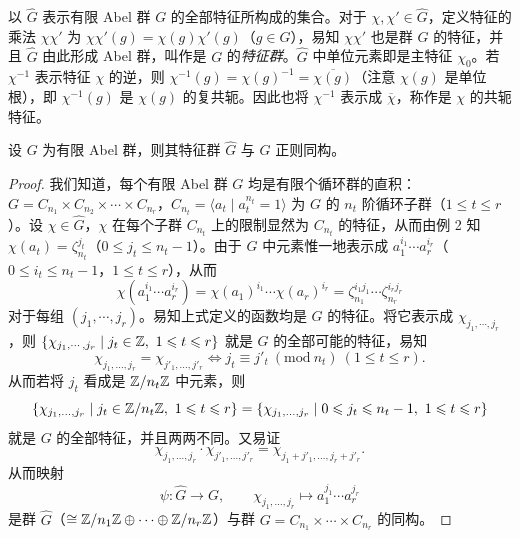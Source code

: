 以 $\widehat{G}$ 表示有限 Abel 群 $G$ 的全部特征所构成的集合。对于 $\chi,\chi'\in\widehat{G}$，定义特征的乘法 $\chi\chi'$ 为 $\chi\chi'(g)=\chi(g)\chi'(g)$（$g\in G$），易知 $\chi\chi'$ 也是群 $G$ 的特征，并且 $\widehat{G}$ 由此形成 Abel 群，叫作是 $G$ 的\emph{特征群}。$\widehat{G}$ 中单位元素即是主特征 $\chi_0$。若 $\chi^{-1}$ 表示特征 $\chi$ 的逆，则 $\chi^{-1}(g)=\chi(g)^{-1}=\overline{\chi(g)}$（注意 $\chi(g)$ 是单位根），即 $\chi^{-1}(g)$ 是 $\chi(g)$ 的复共轭。因此也将 $\chi^{-1}$ 表示成 $\overline{\chi}$，称作是 $\chi$ 的共轭特征。

\begin{theorem}\label{thm:4.5}
设 $G$ 为有限 Abel 群，则其特征群 $\widehat{G}$ 与 $G$ 正则同构。
\end{theorem}

\begin{proof}
我们知道，每个有限 Abel 群 $G$ 均是有限个循环群的直积：$G=C_{n_1}\times C_{n_2}\times\cdots\times C_{n_r}$，$C_{n_t}=\langle a_t\mid a_t^{n_t}=1\rangle$ 为 $G$ 的 $n_t$ 阶循环子群（$1\leqslant t\leqslant r$）。设 $\chi\in\widehat{G}$，$\chi$ 在每个子群 $C_{n_t}$ 上的限制显然为 $C_{n_t}$ 的特征，从而由例 2 知 $\chi(a_t)=\zeta_{n_t}^{j_t}$（$0\leqslant j_t\leqslant n_t-1$）。由于 $G$ 中元素惟一地表示成 $a_1^{i_1}\cdots a_r^{i_r}$（$0\leqslant i_t\leqslant n_t-1$，$1\leqslant t\leqslant r$），从而
\[
  \chi(a_1^{i_1}\cdots a_r^{i_r})=\chi(a_1)^{i_1}\cdots\chi(a_r)^{i_r}
  =\zeta_{n_1}^{i_1j_1}\cdots\zeta_{n_r}^{i_rj_r}
\]
对于每组 $(j_1,\cdots,j_r)$。易知上式定义的函数均是 $G$ 的特征。将它表示成 $\chi_{j_1,\cdots,j_r}$，则 $\{\chi_{j_1,\cdots,j_r}\mid j_t\in\Z,\ 1\leqslant t\leqslant r\}$ 就是 $G$ 的全部可能的特征，易知
\[
  \chi_{j_1,\dots,j_r}=\chi_{j'_1,\dots,j'_r}\Leftrightarrow j_t\equiv j'_t\ (\mathrm{mod}\ n_t)\ (1\leqslant t\leqslant r).
\]
从而若将 $j_t$ 看成是 $\mathbb{Z}/n_t\mathbb{Z}$ 中元素，则
\[
  \{\chi_{j_1,\dots,j_r}\mid j_t\in\Z/n_t\Z,\ 1\leqslant t\leqslant r\}
  =\{\chi_{j_1,\dots,j_r}\mid 0\leqslant j_t\leqslant n_t-1,\ 1\leqslant t\leqslant r\}
\]
就是 $G$ 的全部特征，并且两两不同。又易证
\[
  \chi_{j_1,\dots,j_r}\cdot\chi_{j'_1,\dots,j'_r}=\chi_{j_1+j'_1,\dots,j_r+j'_r}.
\]
从而映射
\[
  \psi\colon\widehat{G}\to G,\qquad \chi_{j_1,\dots,j_r}\mapsto a_1^{j_1}\cdots a_r^{j_r}
\]
是群 $\widehat{G}$（$\cong\mathbb{Z}/n_1\mathbb{Z}\oplus\cdots\oplus\mathbb{Z}/n_r\mathbb{Z}$）与群 $G=C_{n_1}\times\cdots\times C_{n_r}$ 的同构。
\end{proof}

\setcounter{example}{0}%

